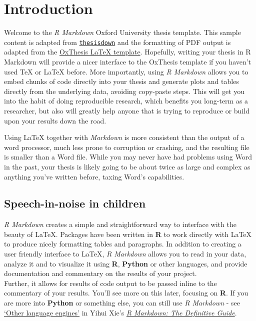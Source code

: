 \documentclass[a4paper, twoside]{templates/ociamthesis}
\begin{document}
\hypertarget{introduction}{%
\chapter*{Introduction}\label{introduction}}

\adjustmtc

Welcome to the \emph{R Markdown} Oxford University thesis template.
This sample content is adapted from \href{https://github.com/ismayc/thesisdown}{\texttt{thesisdown}} and the formatting of PDF output is adapted from the \href{https://github.com/mcmanigle/OxThesis}{OxThesis LaTeX template}.
Hopefully, writing your thesis in R Markdown will provide a nicer interface to the OxThesis template if you haven't used TeX or LaTeX before.
More importantly, using \emph{R Markdown} allows you to embed chunks of code directly into your thesis and generate plots and tables directly from the underlying data, avoiding copy-paste steps.
This will get you into the habit of doing reproducible research, which benefits you long-term as a researcher, but also will greatly help anyone that is trying to reproduce or build upon your results down the road.

Using LaTeX together with \emph{Markdown} is more consistent than the output of a word processor, much less prone to corruption or crashing, and the resulting file is smaller than a Word file.
While you may never have had problems using Word in the past, your thesis is likely going to be about twice as large and complex as anything you've written before, taxing Word's capabilities.

\hypertarget{speech-in-noise-in-children}{%
\section*{Speech-in-noise in children}\label{speech-in-noise-in-children}}

\emph{R Markdown} creates a simple and straightforward way to interface with the beauty of LaTeX.
Packages have been written in \textbf{R} to work directly with LaTeX to produce nicely formatting tables and paragraphs.
In addition to creating a user friendly interface to LaTeX, \emph{R Markdown} allows you to read in your data, analyze it and to visualize it using \textbf{R}, \textbf{Python} or other languages, and provide documentation and commentary on the results of your project.\\
Further, it allows for results of code output to be passed inline to the commentary of your results.
You'll see more on this later, focusing on \textbf{R}. If you are more into \textbf{Python} or something else, you can still use \emph{R Markdown} - see \href{https://bookdown.org/yihui/rmarkdown/language-engines.html}{`Other language engines'} in Yihui Xie's \href{https://bookdown.org/yihui/rmarkdown/language-engines.html}{\emph{R Markdown: The Definitive Guide}}.
\end{document}
